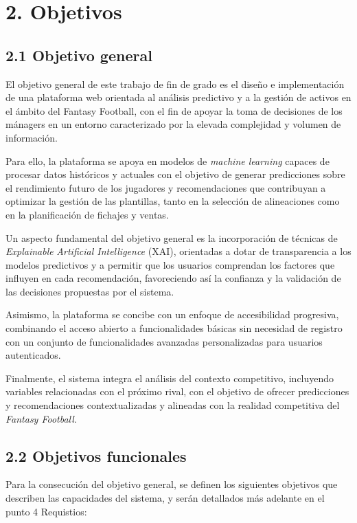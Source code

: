\section*{2. Objetivos}

\subsection{2.1 Objetivo general}

El objetivo general de este trabajo de fin de grado es el diseño e implementación de una 
plataforma web orientada al análisis predictivo y a la gestión de activos en el ámbito del 
Fantasy Football, con el fin de apoyar la toma de decisiones de los mánagers en un entorno 
caracterizado por la elevada complejidad y volumen de información.

Para ello, la plataforma se apoya en modelos de \textit{machine learning} capaces de procesar datos 
históricos y actuales con el objetivo de generar predicciones sobre el rendimiento futuro de 
los jugadores y recomendaciones que contribuyan a optimizar la gestión de las plantillas, 
tanto en la selección de alineaciones como en la planificación de fichajes y ventas.

Un aspecto fundamental del objetivo general es la incorporación de técnicas de \textit{Explainable} 
\textit{Artificial Intelligence} (XAI), orientadas a dotar de transparencia a los modelos predictivos 
y a permitir que los usuarios comprendan los factores que influyen en cada recomendación, 
favoreciendo así la confianza y la validación de las decisiones propuestas por el sistema.

Asimismo, la plataforma se concibe con un enfoque de accesibilidad progresiva, combinando 
el acceso abierto a funcionalidades básicas sin necesidad de registro con un conjunto de 
funcionalidades avanzadas personalizadas para usuarios autenticados.

Finalmente, el sistema integra el análisis del contexto competitivo, incluyendo variables 
relacionadas con el próximo rival, con el objetivo de ofrecer predicciones y recomendaciones 
contextualizadas y alineadas con la realidad competitiva del \textit{Fantasy Football}.

\subsection{2.2 Objetivos funcionales}

Para la consecución del objetivo general, se definen los siguientes objetivos que describen 
las capacidades del sistema, y serán detallados más adelante en el punto 4 Requistios:

